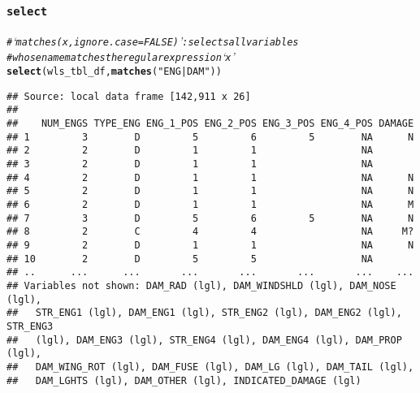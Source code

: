 \documentclass{beamer}\usepackage[]{graphicx}\usepackage[]{color}
\makeatletter
\newcommand{\hlstr}[1]{\textcolor[rgb]{0.192,0.494,0.8}{#1}}%
\newcommand{\hlcom}[1]{\textcolor[rgb]{0.678,0.584,0.686}{\textit{#1}}}%
\newcommand{\hlstd}[1]{\textcolor[rgb]{0.345,0.345,0.345}{#1}}%
\newcommand{\hlkwd}[1]{\textcolor[rgb]{0.737,0.353,0.396}{\textbf{#1}}}%
\newenvironment{kframe}{%
 \def\at@end@of@kframe{}%
 \ifinner\ifhmode%
  \def\at@end@of@kframe{\end{minipage}}%
  \begin{minipage}{\columnwidth}%
 \fi\fi%
 \def\FrameCommand##1{\hskip\@totalleftmargin \hskip-\fboxsep
 \colorbox{shadecolor}{##1}\hskip-\fboxsep
     \hskip-\linewidth \hskip-\@totalleftmargin \hskip\columnwidth}%
 \MakeFramed {\advance\hsize-\width
   \@totalleftmargin\z@ \linewidth\hsize
   \@setminipage}}%
 {\par\unskip\endMakeFramed%
 \at@end@of@kframe}
\newenvironment{knitrout}{}{} %
\makeatother
\begin{document}
\begin{frame}[fragile]
  \frametitle{{\tt select}}
\begin{knitrout}\footnotesize
{}\color{fgcolor}\begin{kframe}
\begin{alltt}
\hlcom{# ‘matches(x, ignore.case = FALSE)’: selects all variables}
\hlcom{# whose name matches the regular expression ‘x’}
\hlkwd{select}\hlstd{(wls_tbl_df,} \hlkwd{matches}\hlstd{(}\hlstr{"ENG|DAM"}\hlstd{))}
\end{alltt}
\begin{verbatim}
## Source: local data frame [142,911 x 26]
## 
##    NUM_ENGS TYPE_ENG ENG_1_POS ENG_2_POS ENG_3_POS ENG_4_POS DAMAGE
## 1         3        D         5         6         5        NA      N
## 2         2        D         1         1                  NA       
## 3         2        D         1         1                  NA       
## 4         2        D         1         1                  NA      N
## 5         2        D         1         1                  NA      N
## 6         2        D         1         1                  NA      M
## 7         3        D         5         6         5        NA      N
## 8         2        C         4         4                  NA     M?
## 9         2        D         1         1                  NA      N
## 10        2        D         5         5                  NA       
## ..      ...      ...       ...       ...       ...       ...    ...
## Variables not shown: DAM_RAD (lgl), DAM_WINDSHLD (lgl), DAM_NOSE (lgl),
##   STR_ENG1 (lgl), DAM_ENG1 (lgl), STR_ENG2 (lgl), DAM_ENG2 (lgl), STR_ENG3
##   (lgl), DAM_ENG3 (lgl), STR_ENG4 (lgl), DAM_ENG4 (lgl), DAM_PROP (lgl),
##   DAM_WING_ROT (lgl), DAM_FUSE (lgl), DAM_LG (lgl), DAM_TAIL (lgl),
##   DAM_LGHTS (lgl), DAM_OTHER (lgl), INDICATED_DAMAGE (lgl)
\end{verbatim}
\end{kframe}
\end{knitrout}
\end{frame} 
\end{document}
